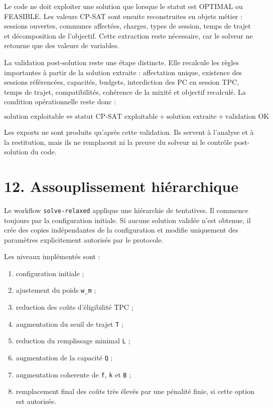 \documentclass[11pt,a4paper]{article}
\begin{document}
Le code ne doit exploiter une solution que lorsque le statut est OPTIMAL ou FEASIBLE. Les valeurs CP-SAT sont ensuite reconstruites en objets métier : sessions ouvertes, communes affectées, charges, types de session, temps de trajet et décomposition de l'objectif. Cette extraction reste nécessaire, car le solveur ne retourne que des valeurs de variables.

La validation post-solution reste une étape distincte. Elle recalcule les règles importantes à partir de la solution extraite : affectation unique, existence des sessions référencées, capacités, budgets, interdiction des PC en session TPC, temps de trajet, compatibilités, cohérence de la mixité et objectif recalculé. La condition opérationnelle reste donc :

\[
\text{solution exploitable}
\Longleftrightarrow
\text{statut CP-SAT exploitable}
+
\text{solution extraite}
+
\text{validation OK}
\]

Les exports ne sont produits qu'après cette validation. Ils servent à l'analyse et à la restitution, mais ils ne remplacent ni la preuve du solveur ni le contrôle post-solution du code.

\section{12. Assouplissement hiérarchique}

Le workflow \texttt{solve-relaxed} applique une hiérarchie de tentatives. Il commence toujours par la configuration initiale. Si aucune solution validée n'est obtenue, il crée des copies indépendantes de la configuration et modifie uniquement des paramètres explicitement autorisés par le protocole.

Les niveaux implémentés sont :

\begin{enumerate}
\item configuration initiale ;
\item ajustement du poids \texttt{w\_m} ;
\item reduction des coûts d'éligibilité TPC ;
\item augmentation du seuil de trajet \texttt{T} ;
\item reduction du remplissage minimal \texttt{L} ;
\item augmentation de la capacité \texttt{Q} ;
\item augmentation coherente de \texttt{f}, \texttt{k} et \texttt{B} ;
\item remplacement final des coûts très élevés par une pénalité finie, si cette
option est autorisée.

\end{enumerate}
\end{document}
